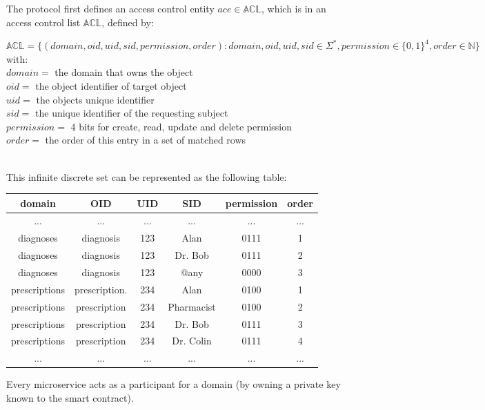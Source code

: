 \documentclass[12pt, conference]{IEEEtran}
\begin{document}
The protocol first defines an access control entity $ ace \in \mathbb{ACL} $, which is in an access control list $ \mathbb{ACL} $, defined by:
\begin{footnotesize}
$
\mathbb{ACL} = \{ (domain, oid, uid, sid, permission, order) : domain, oid, uid, sid \in \Sigma^*,  permission \in \{0,1\}^4, order \in \mathbb{N} \} 
 $
 with: \\
 $ domain = $ the domain that owns the object  \\
 $ oid = $ the object identifier of target object \\
 $ uid = $ the objects unique identifier \\
 $ sid = $ the unique identifier of the requesting subject \\
 $ permission = $ 4 bits for create, read, update and delete permission \\
 $ order = $ the order of this entry in a set of matched rows \\
 \\
\end{footnotesize}
This infinite discrete set can be represented as the following table:

\begin{table}[!h]
\centering
\tiny
\begin{tabular}{|c|c|c|c|c|c|}
\hline \rule[-2ex]{0pt}{5.5ex} domain & OID & UID & SID & permission & order \\ 
\hline
... & ... & ... & ... & ... & ... \\
diagnoses & diagnosis & 123 & Alan & 0111 & 1 \\ 
diagnoses & diagnosis & 123 & Dr. Bob & 0111 & 2 \\ 
diagnoses & diagnosis & 123 & @any & 0000 & 3 \\ 
prescriptions & prescription. & 234 & Alan & 0100 & 1 \\ 
prescriptions & prescription & 234 & Pharmacist & 0100 & 2 \\
prescriptions & prescription & 234 & Dr. Bob & 0111 & 3 \\
prescriptions & prescription & 234 & Dr. Colin & 0111 & 4 \\
... & ... & ... & ... & ... & ... \\
\hline
\end{tabular}

\end{table}


Every microservice acts as a participant for a domain (by owning a private key known to the smart contract). 
\end{document}
